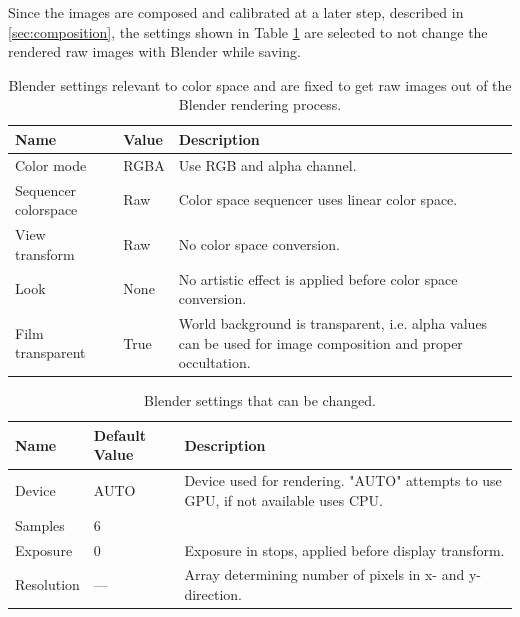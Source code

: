 Since the images are composed and calibrated at a later step, described in \ref{sec:composition}, the settings shown in Table \ref{tab:color_space} are selected to not change the rendered raw images with Blender while saving.

\begin{table}[htpb]
\caption{Blender settings relevant to color space and are fixed to get raw images out of the Blender rendering process.}
\label{tab:color_space}
\begin{tabular}{p{}|p{}|p{}}
\textbf{Name}        & \textbf{Value} & \textbf{Description}                                                                                         \\ \hline
Color mode           & RGBA           & Use RGB and alpha channel.                                                                                   \\
Sequencer colorspace & Raw            & Color space sequencer uses linear color space.                                                               \\
View transform       & Raw            & No color space conversion.                                                                                   \\
Look                 & None           & No artistic effect is applied before color space conversion.                                                 \\
Film transparent     & True           & World background is transparent, i.e. alpha values can be used for image composition and proper occultation.
\end{tabular}
\end{table}

\begin{table}[htpb]
\caption{Blender settings that can be changed.}
\label{tab:blender_settings_input}
\begin{tabular}{p{}|p{}|p{}}
\textbf{Name}       & \textbf{Default Value} & \textbf{Description}                                                                                                         \\ \hline
Device     & AUTO          & Device used for rendering. "AUTO" attempts to use GPU, if not available uses CPU. \\
Samples    & 6             &                                                                                                                     \\
Exposure   & 0             & Exposure in stops, applied before display transform.                                                                \\
Resolution & ---           & Array determining number of pixels in x- and y-direction.                                                          
\end{tabular}
\end{table}

